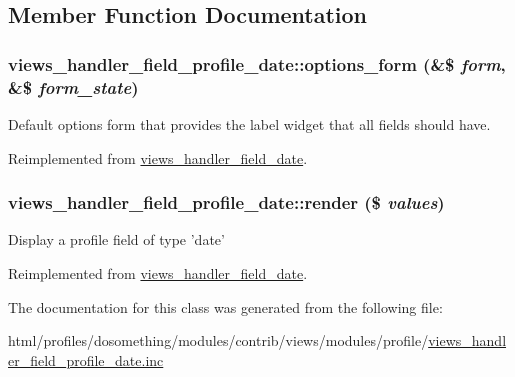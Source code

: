 \subsection{Member Function Documentation}
\hypertarget{classviews__handler__field__profile__date_aede3f5f93411ff64dd780b9837d19aec}{
\subsubsection[{options\_\-form}]{\setlength{\rightskip}{0pt plus 5cm}views\_\-handler\_\-field\_\-profile\_\-date::options\_\-form (\&\$ {\em form}, \/  \&\$ {\em form\_\-state})}}
\label{classviews__handler__field__profile__date_aede3f5f93411ff64dd780b9837d19aec}
Default options form that provides the label widget that all fields should have. 

Reimplemented from \hyperlink{classviews__handler__field__date_acc152b1ff3dd0a65bc4d372c97c7c8e0}{views\_\-handler\_\-field\_\-date}.\hypertarget{classviews__handler__field__profile__date_acac0d13ae857ccb63e8fe338c8e4dde4}{
\subsubsection[{render}]{\setlength{\rightskip}{0pt plus 5cm}views\_\-handler\_\-field\_\-profile\_\-date::render (\$ {\em values})}}
\label{classviews__handler__field__profile__date_acac0d13ae857ccb63e8fe338c8e4dde4}
Display a profile field of type 'date' 

Reimplemented from \hyperlink{classviews__handler__field__date_a4ed821df9270dc90bd3c2103d7136d47}{views\_\-handler\_\-field\_\-date}.

The documentation for this class was generated from the following file:\begin{DoxyCompactItemize}
\item 
html/profiles/dosomething/modules/contrib/views/modules/profile/\hyperlink{views__handler__field__profile__date_8inc}{views\_\-handler\_\-field\_\-profile\_\-date.inc}\end{DoxyCompactItemize}
